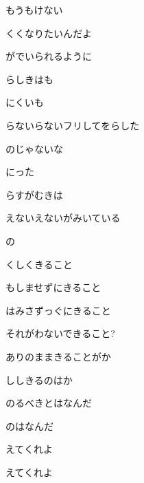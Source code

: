 \documentclass[a4paper,tate,twocolumn,12pt]{ltjtarticle}
\begin{document}
\begin{flushleft}
\begin{minipage}{\linewidth}
もうもけない

くくなりたいんだよ

がでいられるように
\end{minipage}

\vspace{2em}

\noindent\begin{minipage}{\linewidth}
らしきはも

にくいも

らないらないフリしてをらした

のじゃないな

にった

らすがむきは

えないえないがみいている

の
\end{minipage}

\vspace{2em}

\noindent\begin{minipage}{\linewidth}
くしくきること

もしませずにきること

はみさずっぐにきること

それがわないできること?

ありのままきることがか

ししきるのはか

のるべきとはなんだ

のはなんだ

えてくれよ

えてくれよ
\end{minipage}


\end{flushleft}
\end{document}
